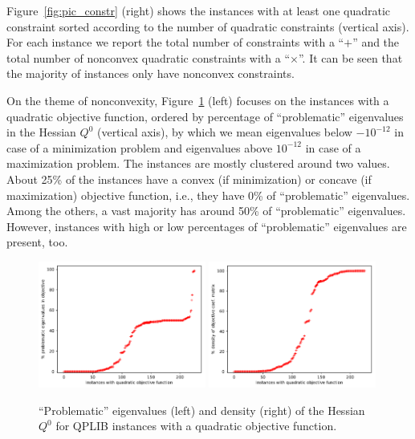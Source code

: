 Figure~\ref{fig:pic_constr} (right) shows the instances with at least one quadratic constraint sorted according to the number of quadratic constraints (vertical axis). For each instance we report the total number of constraints with a ``$+$''
and the total number of nonconvex quadratic constraints
with a ``$\times$''.
It can be seen that the majority of instances only have nonconvex constraints. %




On the theme of nonconvexity, Figure~\ref{fig:pic_neg_eig} (left) focuses on
the instances with a quadratic objective function, ordered by 
 percentage of ``problematic'' eigenvalues in the Hessian $Q^0$ (vertical axis), by which
we mean {eigenvalues below $-10^{-12}$} in case of a minimization problem and {eigenvalues above $10^{-12}$} in case of a maximization problem.
The instances are mostly clustered around two values. About 25\% of the instances have a convex (if minimization) or concave (if maximization) objective function,
i.e., they have 0\% of ``problematic'' eigenvalues. Among the others, a vast
majority has around 50\% of ``problematic'' eigenvalues. However, instances
with high or low percentages of ``problematic'' eigenvalues are present, too.

\begin{figure}\centering
  \includegraphics[width=0.49\textwidth]{pic_neg_eig.pdf}
  \includegraphics[width=0.49\textwidth]{pic_density.pdf}
  \caption{``Problematic'' eigenvalues (left) and density (right) of the Hessian $Q^0$ for QPLIB instances with a quadratic objective function. \label{fig:pic_neg_eig}}
\end{figure}

